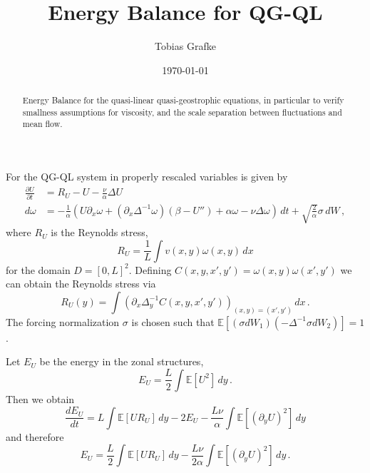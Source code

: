 \documentclass[11pt]{amsart}
\def\EE{\mathbb{E}}\def\PP{\mathbb{P}}
\begin{document}
\title{Energy Balance for QG-QL}
\date{\today}
\author{Tobias Grafke}

\begin{abstract}
  Energy Balance for the quasi-linear quasi-geostrophic equations, in
  particular to verify smallness assumptions for viscosity, and the
  scale separation between fluctuations and mean flow.
\end{abstract}

\maketitle

For the QG-QL system in properly rescaled variables is given by
\begin{subequations}
  \begin{align}
    \frac{\partial U}{\partial t} &= R_U - U - \frac{\nu}{\alpha} \Delta U\\
    d\omega &= -\frac1\alpha\left(U\partial_x \omega + (\partial_x \Delta^{-1}\omega)(\beta-U'') +\alpha \omega - \nu\Delta\omega\right)\,dt + \sqrt{\frac2\alpha}\sigma\,dW\,,
  \end{align}
\end{subequations}
where $R_U$ is the Reynolds stress,
\begin{equation}
  R_U = \frac1L\int v(x,y)\omega(x,y)\,dx
\end{equation}
for the domain $D=[0,L]^2$. Defining $C(x,y,x',y') =
\omega(x,y)\omega(x',y')$ we can obtain the Reynolds stress via
\begin{equation}
  R_U(y) = \int\left(\partial_x \Delta_y^{-1} C(x,y,x',y')\right)_{(x,y)=(x',y')}\,dx\,.
\end{equation}
The forcing normalization $\sigma$ is chosen such that $\EE[(\sigma
  dW_1)(-\Delta^{-1}\sigma dW_2)] = 1$.

Let $E_U$ be the energy in the zonal structures,
\begin{equation}
  E_U = \frac L2 \int \EE [U^2]\,dy\,.
\end{equation}
Then we obtain
\begin{equation}
  \frac{dE_U}{dt} = L\int \EE [UR_U]\,dy - 2E_U - \frac{L\nu}{\alpha} \int\EE[(\partial_y U)^2]\,dy
\end{equation}
and therefore
\begin{equation}
  E_U = \frac L2 \int \EE [UR_U]\,dy - \frac{L\nu}{2\alpha} \int\EE[(\partial_y U)^2]\,dy\,.
\end{equation}
\end{document}
